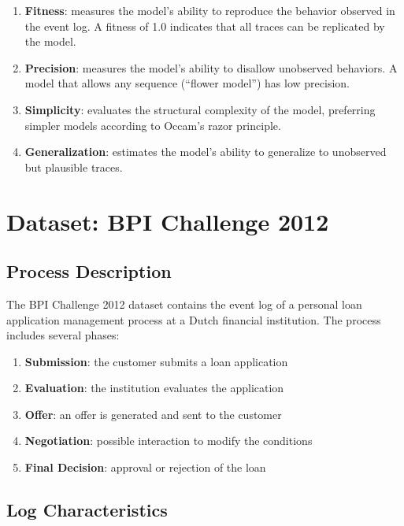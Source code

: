 \documentclass[a4paper,twoside,12pt]{article}
\begin{document}
\begin{enumerate}
    \item \textbf{Fitness}: measures the model's ability to reproduce the behavior observed in the event log. A fitness of 1.0 indicates that all traces can be replicated by the model.
    
    \item \textbf{Precision}: measures the model's ability to disallow unobserved behaviors. A model that allows any sequence (``flower model'') has low precision.
    
    \item \textbf{Simplicity}: evaluates the structural complexity of the model, preferring simpler models according to Occam's razor principle.
    
    \item \textbf{Generalization}: estimates the model's ability to generalize to unobserved but plausible traces.
\end{enumerate}

\section{Dataset: BPI Challenge 2012}

\subsection{Process Description}

The BPI Challenge 2012 dataset contains the event log of a personal loan application management process at a Dutch financial institution. The process includes several phases:

\begin{enumerate}
    \item \textbf{Submission}: the customer submits a loan application
    \item \textbf{Evaluation}: the institution evaluates the application
    \item \textbf{Offer}: an offer is generated and sent to the customer
    \item \textbf{Negotiation}: possible interaction to modify the conditions
    \item \textbf{Final Decision}: approval or rejection of the loan
\end{enumerate}

\subsection{Log Characteristics}
\end{document}
